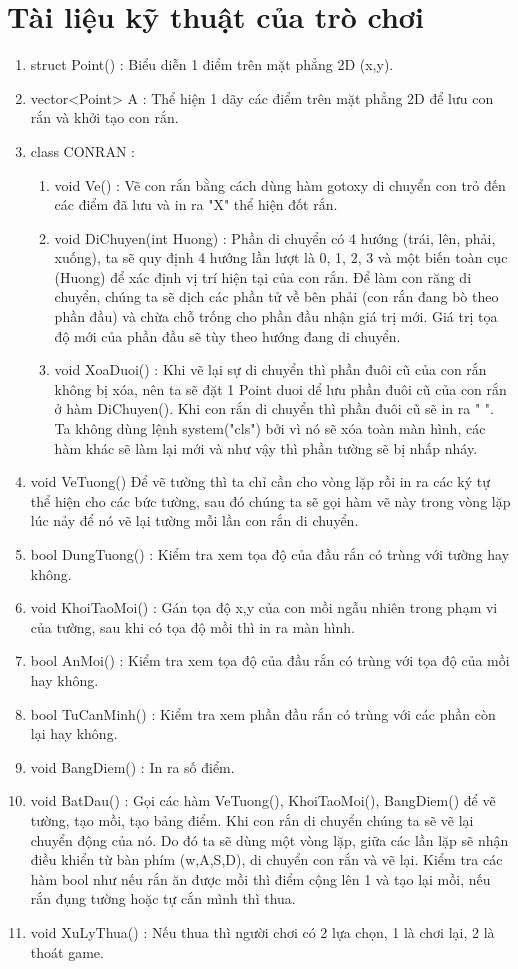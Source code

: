 \documentclass[a4paper,14pt]{extreport}
\begin{document}
\section{Tài liệu kỹ thuật của trò chơi}
\begin{enumerate}[-]
\item struct Point() : Biểu diễn 1 điểm trên mặt phẳng 2D (x,y).
\item vector<Point> A : Thể hiện 1 dãy các điểm trên mặt phẳng 2D để lưu con rắn và khởi tạo con rắn.
\item class CONRAN : 
      \begin{enumerate}[+]
            \item void Ve() : Vẽ con rắn bằng cách dùng hàm gotoxy di chuyển con trỏ đến các điểm đã lưu và in ra "X" thể hiện đốt rắn.
            \item void DiChuyen(int Huong) : Phần di chuyển có 4 hướng (trái, lên, phải, xuống), ta sẽ quy định 4 hướng lần lượt là 0, 1, 2, 3 và một biến toàn cục (Huong) để xác định vị trí hiện tại của con rắn. Để làm con răng di chuyển, chúng ta sẽ dịch các phần tử về bên phải (con rắn đang bò theo phần đầu) và chừa chỗ trống cho phần đầu nhận giá trị mới. Giá trị tọa độ mới của phần đầu sẽ tùy theo hướng đang di chuyển. 
            \item void XoaDuoi() : Khi vẽ lại sự di chuyển thì phần đuôi cũ của con rắn không bị xóa, nên ta sẽ đặt 1 Point duoi dể lưu phần đuôi cũ của con rắn ở hàm DiChuyen(). Khi con rắn di chuyển thì phần đuôi cũ sẽ in ra " ". Ta không dùng lệnh system("cls") bởi vì nó sẽ xóa toàn màn hình, các hàm khác sẽ làm lại mới và như vậy thì phần tường sẽ bị nhấp nháy.
        \end{enumerate} 
\item void VeTuong() Để vẽ tường thì ta chỉ cần cho vòng lặp rồi in ra các ký tự thể hiện cho các bức tường, sau đó chúng ta sẽ gọi hàm vẽ này trong vòng lặp lúc nảy để nó vẽ lại tường mỗi lần con rắn di chuyển.
\item bool DungTuong() : Kiểm tra xem tọa độ của đầu rắn có trùng với tường hay không.
\item void KhoiTaoMoi() : Gán tọa độ x,y của con mồi ngẫu nhiên trong phạm vi của tường, sau khi có tọa độ mồi thì in ra màn hình.
\item bool AnMoi() : Kiểm tra xem tọa độ của đầu rắn có trùng với tọa độ của mồi hay không.
\item bool TuCanMinh() : Kiểm tra xem phần đầu rắn có trùng với các phần còn lại hay không. 
\item void BangDiem() : In ra số điểm.
\item void BatDau() : Gọi các hàm VeTuong(), KhoiTaoMoi(), BangDiem() để vẽ tường, tạo mồi, tạo bảng điểm. Khi con rắn di chuyển chúng ta sẽ vẽ lại chuyển động của nó. Do đó ta  sẽ dùng một vòng lặp, giữa các lần lặp sẽ nhận điều khiển từ bàn phím (w,A,S,D), di chuyển con rắn và vẽ lại. Kiểm tra các hàm bool như nếu rắn ăn được mồi thì điểm cộng lên 1 và tạo lại mồi, nếu rắn đụng tường hoặc tự cắn mình thì thua.
\item void XuLyThua() : Nếu thua thì người chơi có 2 lựa chọn, 1 là chơi lại, 2 là thoát game.
\end{enumerate}
\end{document}
